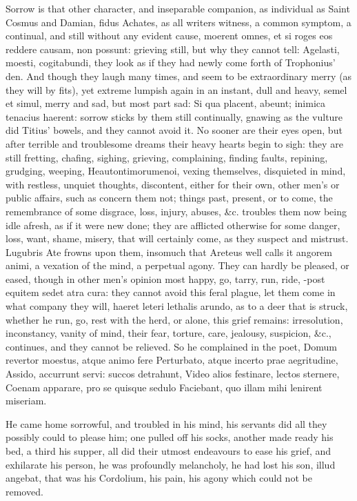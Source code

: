 {Sorrow is that other character, and inseparable companion, as
individual as Saint Cosmus and Damian, fidus Achates, as all writers
witness, a common symptom, a continual, and still without any evident
cause, moerent omnes, et si roges eos reddere causam, non
possunt: grieving still, but why they cannot tell: Agelasti, moesti,
cogitabundi, they look as if they had newly come forth of Trophonius'
den. And though they laugh many times, and seem to be extraordinary
merry (as they will by fits), yet extreme lumpish again in an instant,
dull and heavy, semel et simul, merry and sad, but most part sad:
Si qua placent, abeunt; inimica tenacius haerent: sorrow sticks
by them still continually, gnawing as the vulture did Titius'
bowels, and they cannot avoid it. No sooner are their eyes open, but
after terrible and troublesome dreams their heavy hearts begin to sigh:
they are still fretting, chafing, sighing, grieving, complaining,
finding faults, repining, grudging, weeping, Heautontimorumenoi, vexing
themselves, disquieted in mind, with restless, unquiet thoughts,
discontent, either for their own, other men's or public affairs, such
as concern them not; things past, present, or to come, the remembrance
of some disgrace, loss, injury, abuses, \&c. troubles them now being
idle afresh, as if it were new done; they are afflicted otherwise for
some danger, loss, want, shame, misery, that will certainly come, as
they suspect and mistrust. Lugubris Ate frowns upon them, insomuch that
Areteus well calls it angorem animi, a vexation of the mind, a
perpetual agony. They can hardly be pleased, or eased, though in other
men's opinion most happy, go, tarry, run, ride, -post equitem
sedet atra cura: they cannot avoid this feral plague, let them come in
what company they will, haeret leteri lethalis arundo, as to a
deer that is struck, whether he run, go, rest with the herd, or alone,
this grief remains: irresolution, inconstancy, vanity of mind, their
fear, torture, care, jealousy, suspicion, \&c., continues, and they
cannot be relieved. So he complained in the poet,
Domum revertor moestus, atque animo fere
Perturbato, atque incerto prae aegritudine,
Assido, accurrunt servi: succos detrahunt,
Video alios festinare, lectos sternere,
Coenam apparare, pro se quisque sedulo
Faciebant, quo illam mihi lenirent miseriam.

He came home sorrowful, and troubled in his mind, his servants did all
they possibly could to please him; one pulled off his socks, another
made ready his bed, a third his supper, all did their utmost endeavours
to ease his grief, and exhilarate his person, he was profoundly
melancholy, he had lost his son, illud angebat, that was his Cordolium,
his pain, his agony which could not be removed.

}
